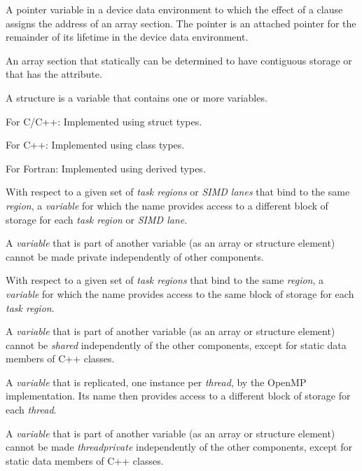 \glossarydefstart
A pointer variable in a device data environment to which the effect of a  clause
assigns the address of
an array section.  The pointer is
an attached pointer for the remainder of its lifetime in the device data environment.
\glossarydefend
\bigskip

\glossarydefstart
An array section that statically can be determined to have contiguous storage or that has the  attribute.
\glossarydefend
\bigskip

\glossarydefstart
A structure is a variable that contains one or more variables.

For C/C++:
\nopagebreak
Implemented using struct types.

For C++:
\nopagebreak
Implemented using class types.

For Fortran:
\nopagebreak
Implemented using derived types.
\glossarydefend

\glossarydefstart
With respect to a given set of \emph{task regions} or \emph{SIMD lanes} that bind to the same
 \emph{region}, a \emph{variable} for which the name provides access to a different block of
storage for each \emph{task region} or \emph{SIMD lane}.

A \emph{variable} that is part of another variable (as an array or structure element) cannot
be made private independently of other components.
\glossarydefend

\glossarydefstart
With respect to a given set of \emph{task regions} that bind to the same 
\emph{region}, a \emph{variable} for which the name provides access to the same block of storage for
each \emph{task region}.

A \emph{variable} that is part of another variable (as an array or structure element) cannot
be \emph{shared} independently of the other components, except for static data members
of C++ classes.
\glossarydefend

\glossarydefstart
A \emph{variable} that is replicated, one instance per \emph{thread}, by the OpenMP
implementation. Its name then provides access to a different block of storage for
each \emph{thread}.

A \emph{variable} that is part of another variable (as an array or structure element) cannot
be made \emph{threadprivate} independently of the other components, except for static
data members of C++ classes.
\glossarydefend

